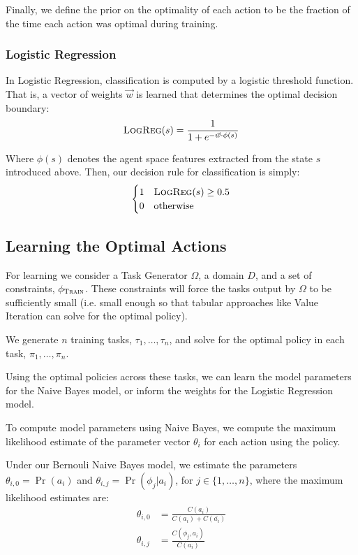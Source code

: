 \documentclass[11pt]{article}
\begin{document}
Finally, we define the prior on the optimality of each action to be
the fraction of the time each action was optimal during training.

\subsubsection{Logistic Regression}

In Logistic Regression, classification is computed by a logistic threshold function. That is, a vector of weights $\vec{w}$ is learned that determines the optimal decision boundary:
\begin{equation}
\textsc{LogReg}(s) = \frac{1}{1 + e^{-\vec{w} \cdot \phi(s)}}
\end{equation}

Where $\phi(s)$ denotes the agent space features extracted from the state $s$ introduced above. Then, our decision rule for classification is simply:
\begin{equation}
\begin{cases}
1&\textsc{LogReg}(s) \geq 0.5 \\
0&\text{otherwise}
\end{cases}
\end{equation}

\subsection{Learning the Optimal Actions}
For learning we consider a Task Generator $\Omega$, a domain $D$, and a set of constraints, $\phi_{\textsc{Train}}$. These constraints will force the tasks output by $\Omega$ to be sufficiently small (i.e. small enough so that tabular approaches like Value Iteration can solve for the optimal policy).

We generate $n$ training tasks, $\tau_1, \ldots, \tau_n$, and solve for the optimal policy in each task, $\pi_1, \ldots, \pi_n$.

Using the optimal policies across these tasks, we can learn the model parameters for the Naive Bayes model, or inform the weights for the Logistic Regression model.

To compute model parameters using Naive Bayes, we compute
the maximum likelihood estimate of the parameter vector $\theta_i$ for
each action using the policy.

Under our Bernouli Naive Bayes model, we estimate the parameters
$\theta_{i,0} = \Pr(a_i)$ and $\theta_{i,j} = \Pr(\phi_j | a_i)$, for $j \in \{1, \ldots, n \}$, where the maximum likelihood estimates are:
\begin{align}
\theta_{i,0} &= \frac{C(a_i)}{C(a_i) + C(\bar{a_i})} \\
\theta_{i,j} &= \frac{C(\phi_j, a_i)}{C(a_i)}
\end{align}
\end{document}
